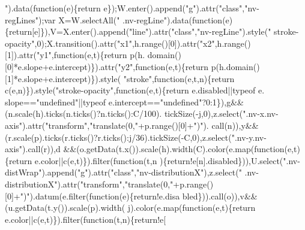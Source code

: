 \begin{DoxyCode}
{      "}).data(\textcolor{keyword}{function}(e)\{\textcolor{keywordflow}{return} e\});W.enter().append(\textcolor{stringliteral}{"g"}).attr(\textcolor{stringliteral}{"class"},\textcolor{stringliteral}{"nv-regLines"});var X=W.selectAll(\textcolor{stringliteral}{"
      .nv-regLine"}).data(\textcolor{keyword}{function}(e)\{\textcolor{keywordflow}{return}[e]\}),V=X.enter().append(\textcolor{stringliteral}{"line"}).attr(\textcolor{stringliteral}{"class"},\textcolor{stringliteral}{"nv-regLine"}).style(\textcolor{stringliteral}{"
      stroke-opacity"},0);X.transition().attr(\textcolor{stringliteral}{"x1"},h.range()[0]).attr(\textcolor{stringliteral}{"x2"},h.range()[1]).attr(\textcolor{stringliteral}{"y1"},\textcolor{keyword}{function}(e,t)\{\textcolor{keywordflow}{return} p(h.
      domain()[0]*e.slope+e.intercept)\}).attr(\textcolor{stringliteral}{"y2"},\textcolor{keyword}{function}(e,t)\{\textcolor{keywordflow}{return} p(h.domain()[1]*e.slope+e.intercept)\}).style(\textcolor{stringliteral}{
      "stroke"},\textcolor{keyword}{function}(e,t,n)\{\textcolor{keywordflow}{return} c(e,n)\}).style(\textcolor{stringliteral}{"stroke-opacity"},\textcolor{keyword}{function}(e,t)\{\textcolor{keywordflow}{return} e.disabled||typeof e.
      slope==\textcolor{stringliteral}{"undefined"}||typeof e.intercept==\textcolor{stringliteral}{"undefined"}?0:1\}),g&&(n.scale(h).ticks(n.ticks()?n.ticks():C/100).
      tickSize(-j,0),z.select(\textcolor{stringliteral}{".nv-x.nv-axis"}).attr(\textcolor{stringliteral}{"transform"},\textcolor{stringliteral}{"translate(0,"}+p.range()[0]+\textcolor{stringliteral}{")"}).
      call(n)),y&&(r.scale(p).ticks(r.ticks()?r.ticks():j/36).tickSize(-C,0),z.select(\textcolor{stringliteral}{".nv-y.nv-axis"}).call(r)),d
      &&(o.getData(t.x()).scale(h).width(C).color(e.map(\textcolor{keyword}{function}(e,t)\{return e.color||c(e,t)\}).filter(\textcolor{keyword}{function}(t,n
      )\{\textcolor{keywordflow}{return}!e[n].disabled\})),U.select(\textcolor{stringliteral}{".nv-distWrap"}).append(\textcolor{stringliteral}{"g"}).attr(\textcolor{stringliteral}{"class"},\textcolor{stringliteral}{"nv-distributionX"}),z.select(\textcolor{stringliteral}{"
      .nv-distributionX"}).attr(\textcolor{stringliteral}{"transform"},\textcolor{stringliteral}{"translate(0,"}+p.range()[0]+\textcolor{stringliteral}{")"}).datum(e.filter(\textcolor{keyword}{function}(e)\{return!e.disa
      bled\})).call(o)),v&&(u.getData(t.y()).scale(p).width(
j).color(e.map(\textcolor{keyword}{function}(e,t)\{return e.color||c(e,t)\}).filter(\textcolor{keyword}{function}(t,n)\{\textcolor{keywordflow}{return}!e[

\end{DoxyCode}
